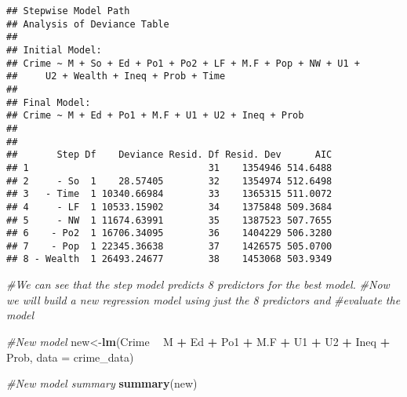 \documentclass[
]{article}
\newenvironment{Shaded}{\begin{snugshade}}{\end{snugshade}}
\newcommand{\CommentTok}[1]{\textcolor[rgb]{0.56,0.35,0.01}{\textit{#1}}}
\newcommand{\DataTypeTok}[1]{\textcolor[rgb]{0.13,0.29,0.53}{#1}}
\newcommand{\KeywordTok}[1]{\textcolor[rgb]{0.13,0.29,0.53}{\textbf{#1}}}
\newcommand{\NormalTok}[1]{#1}
\newcommand{\OperatorTok}[1]{\textcolor[rgb]{0.81,0.36,0.00}{\textbf{#1}}}
\newcommand{\StringTok}[1]{\textcolor[rgb]{0.31,0.60,0.02}{#1}}
\begin{document}
\begin{Shaded}
\end{Shaded}

\begin{verbatim}
## Stepwise Model Path 
## Analysis of Deviance Table
## 
## Initial Model:
## Crime ~ M + So + Ed + Po1 + Po2 + LF + M.F + Pop + NW + U1 + 
##     U2 + Wealth + Ineq + Prob + Time
## 
## Final Model:
## Crime ~ M + Ed + Po1 + M.F + U1 + U2 + Ineq + Prob
## 
## 
##       Step Df    Deviance Resid. Df Resid. Dev      AIC
## 1                                31    1354946 514.6488
## 2     - So  1    28.57405        32    1354974 512.6498
## 3   - Time  1 10340.66984        33    1365315 511.0072
## 4     - LF  1 10533.15902        34    1375848 509.3684
## 5     - NW  1 11674.63991        35    1387523 507.7655
## 6    - Po2  1 16706.34095        36    1404229 506.3280
## 7    - Pop  1 22345.36638        37    1426575 505.0700
## 8 - Wealth  1 26493.24677        38    1453068 503.9349
\end{verbatim}

\begin{Shaded}
\begin{Highlighting}[]
\CommentTok{#We can see that the step model predicts 8 predictors for the best model. }
\CommentTok{#Now we will build a new regression model using just the 8 predictors and }
\CommentTok{#evaluate the model}

\CommentTok{#New model}
\NormalTok{new<-}\KeywordTok{lm}\NormalTok{(Crime }\OperatorTok{~}\StringTok{ }\NormalTok{M }\OperatorTok{+}\StringTok{ }\NormalTok{Ed }\OperatorTok{+}\StringTok{ }\NormalTok{Po1 }\OperatorTok{+}\StringTok{ }\NormalTok{M.F }\OperatorTok{+}\StringTok{ }\NormalTok{U1 }\OperatorTok{+}\StringTok{ }\NormalTok{U2 }\OperatorTok{+}\StringTok{ }\NormalTok{Ineq }\OperatorTok{+}\StringTok{ }\NormalTok{Prob, }\DataTypeTok{data =}\NormalTok{ crime_data)}

\CommentTok{#New model summary}
\KeywordTok{summary}\NormalTok{(new)}
\end{Highlighting}
\end{Shaded}
\end{document}

